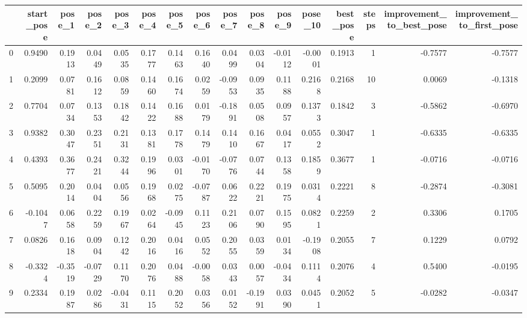 \begin{tabular}{lrrrrrrrrrrrrrrr}
\toprule
{} &  start\_pose &  pose\_1 &  pose\_2 &  pose\_3 &  pose\_4 &  pose\_5 &  pose\_6 &  pose\_7 &  pose\_8 &  pose\_9 &  pose\_10 &  best\_pose &  steps &  improvement\_to\_best\_pose &  improvement\_to\_first\_pose \\
\midrule
0 &      0.9490 &  0.1913 &  0.0449 &  0.0535 &  0.1777 &  0.1463 &  0.1640 &  0.0499 &  0.0304 & -0.0112 &  -0.0001 &     0.1913 &      1 &                   -0.7577 &                    -0.7577 \\
1 &      0.2099 &  0.0781 &  0.1612 &  0.0859 &  0.1460 &  0.1674 &  0.0259 & -0.0953 &  0.0935 &  0.1188 &   0.2168 &     0.2168 &     10 &                    0.0069 &                    -0.1318 \\
2 &      0.7704 &  0.0734 &  0.1353 &  0.1842 &  0.1422 &  0.1688 &  0.0179 & -0.1891 &  0.0508 &  0.0957 &   0.1373 &     0.1842 &      3 &                   -0.5862 &                    -0.6970 \\
3 &      0.9382 &  0.3047 &  0.2351 &  0.2131 &  0.1381 &  0.1778 &  0.1479 &  0.1410 &  0.1667 &  0.0417 &   0.0552 &     0.3047 &      1 &                   -0.6335 &                    -0.6335 \\
4 &      0.4393 &  0.3677 &  0.2421 &  0.3244 &  0.1996 &  0.0301 & -0.0170 & -0.0776 &  0.0744 &  0.1358 &   0.1859 &     0.3677 &      1 &                   -0.0716 &                    -0.0716 \\
5 &      0.5095 &  0.2014 &  0.0404 &  0.0556 &  0.1968 &  0.0275 & -0.0787 &  0.0622 &  0.2221 &  0.1975 &   0.0314 &     0.2221 &      8 &                   -0.2874 &                    -0.3081 \\
6 &     -0.1047 &  0.0658 &  0.2259 &  0.1967 &  0.0264 & -0.0945 &  0.1123 &  0.2106 &  0.0790 &  0.1595 &   0.0821 &     0.2259 &      2 &                    0.3306 &                     0.1705 \\
7 &      0.0826 &  0.1618 &  0.0904 &  0.1242 &  0.2016 &  0.0416 &  0.0552 &  0.2055 &  0.0359 &  0.0134 &  -0.1908 &     0.2055 &      7 &                    0.1229 &                     0.0792 \\
8 &     -0.3324 & -0.3519 & -0.0729 &  0.1170 &  0.2076 &  0.0488 & -0.0058 &  0.0343 &  0.0057 & -0.0434 &   0.1114 &     0.2076 &      4 &                    0.5400 &                    -0.0195 \\
9 &      0.2334 &  0.1987 &  0.0286 & -0.0431 &  0.1115 &  0.2052 &  0.0356 &  0.0152 & -0.1991 &  0.0390 &   0.0451 &     0.2052 &      5 &                   -0.0282 &                    -0.0347 \\
\bottomrule
\end{tabular}
